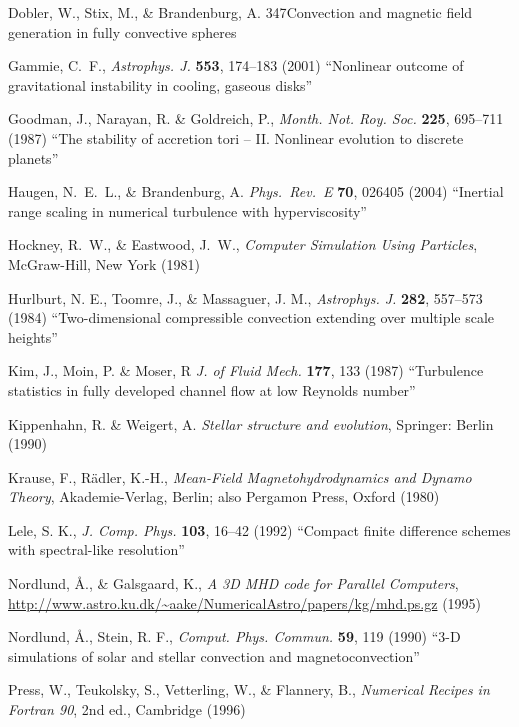 \documentclass[\mydriver,12pt,twoside,notitlepage,a4paper]{article}
\begin{document}
\begin{thebibliography}{99}
  Dobler, W., Stix, M., \& Brandenburg, A.
  {347}{Convection and magnetic field generation in fully convective spheres}

Gammie, C.~F.,
  \emph{Astrophys. J.} \textbf{553}, 174--183 (2001)
  ``Nonlinear outcome of gravitational instability in cooling, gaseous disks''

Goodman, J., Narayan, R. \& Goldreich, P.,
  \emph{Month. Not. Roy. Soc.} \textbf{225}, 695--711 (1987)
  ``The stability of accretion tori -- II. Nonlinear evolution
  to discrete planets''

Haugen, N.~E.~L., \& Brandenburg, A.
  \emph{Phys.~Rev.~E} \textbf{70}, 026405 (2004)
  ``Inertial range scaling in numerical turbulence with hyperviscosity''

Hockney, R.~W., \& Eastwood, J.~W.,
  \emph{Computer Simulation Using Particles},
  McGraw-Hill, New York (1981)

Hurlburt, N. E., Toomre, J., \& Massaguer, J. M.,
  \emph{Astrophys. J.} \textbf{282}, 557--573 (1984)
  ``Two-dimensional compressible convection extending over multiple scale
  heights''

 Kim, J., Moin, P. \& Moser, R
\emph{J. of Fluid Mech.} \textbf{177}, 133 (1987)
``Turbulence statistics in fully developed channel flow at low Reynolds number''

 Kippenhahn, R. \& Weigert, A.
  \emph{Stellar structure and evolution}, Springer: Berlin (1990)

 Krause, F., R\"adler, K.-H.,
  \emph{Mean-Field Magneto\-hy\-dro\-dy\-na\-mics and Dynamo Theory\/},
  Akademie-Verlag, Berlin; also Pergamon Press, Oxford (1980)

Lele, S. K.,
  \emph{J. Comp. Phys.} \textbf{103}, 16--42 (1992)
  ``Compact finite difference schemes with spectral-like resolution''

 Nordlund, \AA., \& Galsgaard, K.,
{\it A 3D MHD code for Parallel Computers},
{\url{http://www.astro.ku.dk/~aake/NumericalAstro/papers/kg/mhd.ps.gz}}
(1995)

 Nordlund, \AA., Stein, R. F.,
  \emph{Comput. Phys. Commun.} \textbf{59}, 119 (1990)
  ``3-D simulations of solar and stellar convection and magnetoconvection''

 Press, W., Teukolsky, S., Vetterling, W., \& Flannery, B.,
  \emph{Numerical Recipes in Fortran 90}, 2nd ed., Cambridge (1996)


\end{thebibliography}
\end{document}
